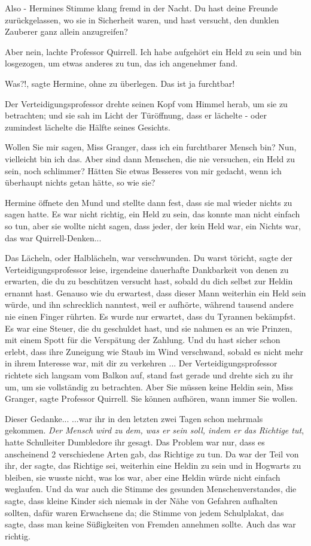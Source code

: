 \glqq{}Also -\grqq{} Hermines Stimme klang fremd in der Nacht. \glqq{}Du hast
deine Freunde zurückgelassen, wo sie in Sicherheit waren, und hast versucht, den
dunklen Zauberer ganz allein anzugreifen?\grqq{}

\glqq{}Aber nein\grqq{}, lachte Professor Quirrell. \glqq{}Ich habe aufgehört ein
Held zu sein und bin losgezogen, um etwas anderes zu tun, das ich angenehmer
fand.\grqq{}

\glqq{}Was?!\grqq{}, sagte Hermine, ohne zu überlegen. \glqq{}Das ist ja
furchtbar!\grqq{}

Der Verteidigungsprofessor drehte seinen Kopf vom Himmel herab, um sie zu
betrachten; und sie sah im Licht der Türöffnung, dass er lächelte - oder
zumindest lächelte die Hälfte seines Gesichts.

\glqq{}Wollen Sie mir sagen, Miss Granger, dass ich ein furchtbarer Mensch bin?
Nun, vielleicht bin ich das. Aber sind dann Menschen, die nie versuchen, ein
Held zu sein, noch schlimmer? Hätten Sie etwas Besseres von mir gedacht, wenn
ich überhaupt nichts getan hätte, so wie sie?\grqq{}

Hermine öffnete den Mund und stellte dann fest, dass sie mal wieder nichts zu
sagen hatte. Es war nicht richtig, ein Held zu sein, das konnte man nicht
einfach so tun, aber sie wollte nicht sagen, dass jeder, der kein Held war, ein
Nichts war, das war Quirrell-Denken...

Das Lächeln, oder Halblächeln, war verschwunden. \glqq{}Du warst töricht\grqq{},
sagte der Verteidigungsprofessor leise, \glqq{}irgendeine dauerhafte Dankbarkeit
von denen zu erwarten, die du zu beschützen versucht hast, sobald du dich selbst
zur Heldin ernannt hast. Genauso wie du erwartest, dass dieser Mann weiterhin
ein Held sein würde, und ihn schrecklich nanntest, weil er aufhörte, während
tausend andere nie einen Finger rührten. Es wurde nur erwartet, dass du Tyrannen
bekämpfst. Es war eine Steuer, die du geschuldet hast, und sie nahmen es an wie
Prinzen, mit einem Spott für die Verspätung der Zahlung. Und du hast sicher
schon erlebt, dass ihre Zuneigung wie Staub im Wind verschwand, sobald es nicht
mehr in ihrem Interesse war, mit dir zu verkehren ...\grqq{} Der
Verteidigungsprofessor richtete sich langsam vom Balkon auf, stand fast gerade
und drehte sich zu ihr um, um sie vollständig zu betrachten. \glqq{}Aber Sie
müssen keine Heldin sein, Miss Granger\grqq{}, sagte Professor Quirrell. \glqq{}
Sie können aufhören, wann immer Sie wollen.\grqq{}

Dieser Gedanke... ...war ihr in den letzten zwei Tagen schon mehrmals gekommen.
\emph{Der Mensch wird zu dem, was er sein soll, indem er das Richtige tut},
hatte Schulleiter Dumbledore ihr gesagt. Das Problem war nur, dass es
anscheinend 2 verschiedene Arten gab, das Richtige zu tun. Da war der Teil von
ihr, der sagte, das Richtige sei, weiterhin eine Heldin zu sein und in Hogwarts
zu bleiben, sie wusste nicht, was los war, aber eine Heldin würde nicht einfach
weglaufen. Und da war auch die Stimme des gesunden Menschenverstandes, die
sagte, dass kleine Kinder sich niemals in der Nähe von Gefahren aufhalten
sollten, dafür waren Erwachsene da; die Stimme von jedem Schulplakat, das sagte,
dass man keine Süßigkeiten von Fremden annehmen sollte. Auch das war richtig.

